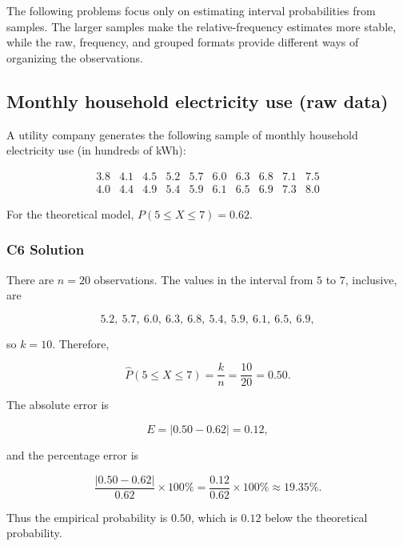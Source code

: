 The following problems focus only on estimating interval probabilities from
samples. The larger samples make the relative-frequency estimates more stable,
while the raw, frequency, and grouped formats provide different ways of
organizing the observations.

\subsection{Monthly household electricity use (raw data)}
\label{sec:c6-only-raw}

A utility company generates the following sample of monthly household
electricity use (in hundreds of kWh):

\[
\begin{array}{cccccccccc}
	3.8 & 4.1 & 4.5 & 5.2 & 5.7 & 6.0 & 6.3 & 6.8 & 7.1 & 7.5 \\
	4.0 & 4.4 & 4.9 & 5.4 & 5.9 & 6.1 & 6.5 & 6.9 & 7.3 & 8.0
\end{array}
\]

For the theoretical model,
$P(5\leq X\leq7)=0.62$.


\subsubsection*{C6 Solution}
\label{subsec:c6-only-raw-solution}

There are $n=20$ observations. The values in the interval from $5$ to $7$,
inclusive, are

\[
5.2,\ 5.7,\ 6.0,\ 6.3,\ 6.8,\ 5.4,\ 5.9,\ 6.1,\ 6.5,\ 6.9,
\]

so $k=10$. Therefore,

\[
\widehat P(5\leq X\leq7)=\frac{k}{n}=\frac{10}{20}=0.50.
\]

The absolute error is

\[
E=|0.50-0.62|=0.12,
\]

and the percentage error is

\[
\frac{|0.50-0.62|}{0.62}\times100\%
=\frac{0.12}{0.62}\times100\%
\approx19.35\%.
\]

Thus the empirical probability is $0.50$, which is $0.12$ below the
theoretical probability.


